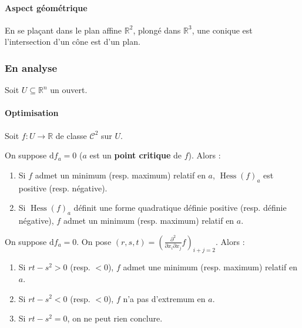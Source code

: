 	\paragraph{Aspect géométrique}
	
	
	\begin{proposition}
		En se plaçant dans le plan affine $\mathbb{R}^2$, plongé dans $\mathbb{R}^3$, une conique est l'intersection d'un cône est d'un plan.
	\end{proposition}
	
	\subsubsection{En analyse}
	
	Soit $U \subseteq \mathbb{R}^n$ un ouvert.
	
	\paragraph{Optimisation}
	
	Soit $f : U \rightarrow \mathbb{R}$ de classe $\mathcal{C}^2$ sur $U$.
	
	
	\begin{theorem}
		On suppose $\mathrm{d}f_a = 0$ ($a$ est un \textbf{point critique} de $f$). Alors :
		\begin{enumerate}[label=(\roman*)]
			\item Si $f$ admet un minimum (resp. maximum) relatif en $a$, $\operatorname{Hess}(f)_a$ est positive (resp. négative).
			\item Si $\operatorname{Hess}(f)_a$ définit une forme quadratique définie positive (resp. définie négative), $f$ admet un minimum (resp. maximum) relatif en $a$.
		\end{enumerate}
	\end{theorem}
	
	\begin{example}
		On suppose $\mathrm{d}f_a = 0$. On pose $(r,s,t) = \left(  \frac{\partial^2}{\partial x_i \partial x_j} f \right)_{i+j=2}$. Alors :
		\begin{enumerate}[label=(\roman*)]
			\item Si $rt-s^2 > 0$ (resp. $< 0$), $f$ admet une minimum (resp. maximum) relatif en $a$.
			\item Si $rt-s^2 < 0$ (resp. $< 0$), $f$ n'a pas d'extremum en $a$.
			\item Si $rt-s^2 = 0$, on ne peut rien conclure.
		\end{enumerate}
	\end{example}
	

